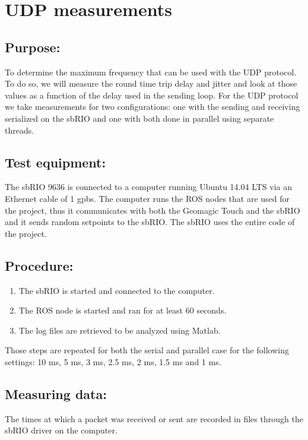 \section{UDP measurements}\label{sec_udp_mes}

\subsection*{Purpose:}

To determine the maximum frequency that can be used with the UDP protocol. To do so, we will measure the round time trip delay and jitter and look at those values as a function of the delay used in the sending loop. For the UDP protocol we take measurements for two configurations: one with the sending and receiving serialized on the sbRIO and one with both done in parallel using separate threads. 

\subsection*{Test equipment:}

The sbRIO 9636 is connected to a computer running Ubuntu 14.04 LTS via an Ethernet cable of 1 gpbs. The computer runs the ROS nodes that are used for the project, thus it communicates with both the Geomagic Touch and the sbRIO and it sends random setpoints to the sbRIO. The sbRIO uses the entire code of the project.

\subsection*{Procedure:}

\begin{enumerate}
	\item The sbRIO is started and connected to the computer.
	\item The ROS node is started and ran for at least 60 seconds. 
	\item The log files are retrieved to be analyzed using Matlab.
\end{enumerate}
Those steps are repeated for both the serial and parallel case for the following settings: 10 ms, 5 ms, 3 ms, 2.5 ms, 2 ms, 1.5 ms and 1 ms.


\subsection*{Measuring data:}

The times at which a packet was received or sent are recorded in files through the sbRIO driver on the computer.

